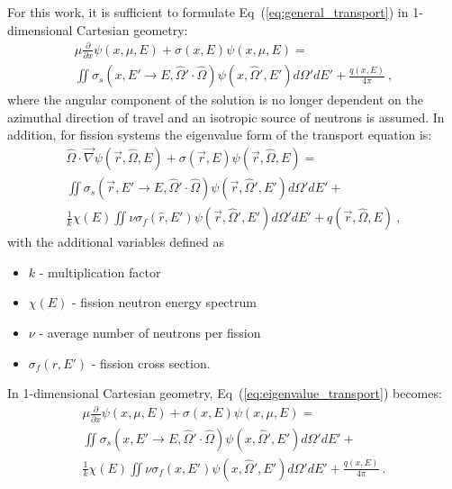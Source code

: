 For this work, it is sufficient to formulate
Eq~(\ref{eq:general_transport}) in 1-dimensional Cartesian geometry:
\begin{multline}
  \mu \frac{\partial}{\partial x} \psi(x,\mu,E) + \sigma(x,E)
  \psi(x,\mu,E) = \\ \iint \sigma_s(x,E' \rightarrow E,\hat{\Omega}'
  \cdot \hat{\Omega}) \psi(x,\hat{\Omega}',E') d\Omega' dE' +
  \frac{q(x,E)}{4 \pi}\:,
  \label{eq:cart_1d_transport}
\end{multline}
where the angular component of the solution is no longer dependent on
the azimuthal direction of travel and an isotropic source of neutrons
is assumed. In addition, for fission systems the eigenvalue form of
the transport equation is:
\begin{multline}
  \hat{\Omega} \cdot \vec{\nabla} \psi(\vec{r},\hat{\Omega},E) +
  \sigma(\vec{r},E) \psi(\vec{r},\hat{\Omega},E) = \\ \iint
  \sigma_s(\vec{r},E' \rightarrow E,\hat{\Omega}' \cdot \hat{\Omega})
  \psi(\vec{r},\hat{\Omega}',E') d\Omega' dE' + \\ \frac{1}{k} \chi(E)
  \iint \nu \sigma_f(\hat{r},E') \psi(\vec{r},\hat{\Omega}',E')
  d\Omega' dE' + q(\vec{r},\hat{\Omega},E) \:,
  \label{eq:eigenvalue_transport}
\end{multline}
with the additional variables defined as
\begin{itemize}
\item $k$ - multiplication factor
\item $\chi(E)$ - fission neutron energy spectrum
\item $\nu$ - average number of neutrons per fission
\item $\sigma_f(r,E')$ - fission cross section\:.
\end{itemize}
In 1-dimensional Cartesian geometry,
Eq~(\ref{eq:eigenvalue_transport}) becomes:
\begin{multline}
  \mu \frac{\partial}{\partial x} \psi(x,\mu,E) + \sigma(x,E)
  \psi(x,\mu,E) = \\ \iint \sigma_s(x,E' \rightarrow
  E,\hat{\Omega}' \cdot \hat{\Omega}) \psi(x,\hat{\Omega}',E')
  d\Omega' dE' + \\ \frac{1}{k} \chi(E)
  \iint \nu \sigma_f(x,E') \psi(x,\hat{\Omega}',E') d\Omega'
  dE' + \frac{q(x,E)}{4 \pi}\:.
  \label{eq:cart_1d_eigenvalue}
\end{multline}

